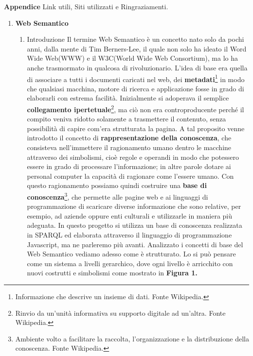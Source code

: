 \documentclass[a4paper,11pt]{article}
\begin{document}
\textbf {Appendice} Link utili, Siti utilizzati e Ringraziamenti.
\newpage

\begin{enumerate}
	\item \LARGE{\textbf{Web Semantico}}
		\begin{enumerate}[label*=\arabic*.]
			\Large
			 
			\item {Introduzione}\newline
Il termine Web Semantico è un concetto nato solo da pochi anni, dalla mente di Tim Berners-Lee, il quale non solo ha ideato il Word Wide Web(WWW) e il W3C(World Wide Web Consortium), ma lo ha anche trasmormato in qualcosa di rivoluzionario. L'idea di base era quella di associare a tutti i documenti caricati nel web, dei \textbf{metadati}\footnote{Informazione che descrive un insieme di dati. Fonte Wikipedia.} in modo che qualsiasi macchina, motore di ricerca e applicazione fosse in grado di elaborarli con estrema facilità.\newline
Inizialmente si adoperava il semplice \textbf{collegamento ipertetuale}\footnote{Rinvio da un'unità informativa su supporto digitale ad un'altra. Fonte Wikipedia.}, ma ciò non era controproducente perché il compito veniva ridotto solamente a trasmettere il contenuto, senza possibilità di capire com'era strutturata la pagina.
A tal proposito venne introdotto il concetto di \textbf{rappresentazione della conoscenza}, che consisteva nell'immettere il ragionamento umano dentro le macchine attraverso dei simbolismi, cioè regole e operandi in modo che potessero essere in grado di processare l'informazione; in altre parole dotare ai personal computer la capacità di ragionare come l'essere umano.
Con questo ragionamento possiamo quindi costruire una \textbf{base di conoscenza}\footnote{Ambiente volto a facilitare la raccolta, l'organizzazione e la distribuzione della conoscenza. Fonte Wikipedia.}, che permette alle pagine web e ai linguaggi di programmazione di scaricare diverse informazione che sono relative, per esempio, ad aziende oppure enti culturali e utilizzarle in maniera più adeguata. In questo progetto si utilizza un base di conoscenza realizzata in SPARQL ed elaborata attraverso il linguaggio di programmazione Javascript, ma ne parleremo più avanti.\newline
Analizzato i concetti di base del Web Semantico vediamo adesso come è strutturato. Lo si può pensare come un sistema a livelli gerarchico, dove ogni livello è arricchito con nuovi costrutti e simbolismi come mostrato in \textbf{Figura 1.}\newpage

\end{enumerate}
\end{enumerate}
\end{document}
